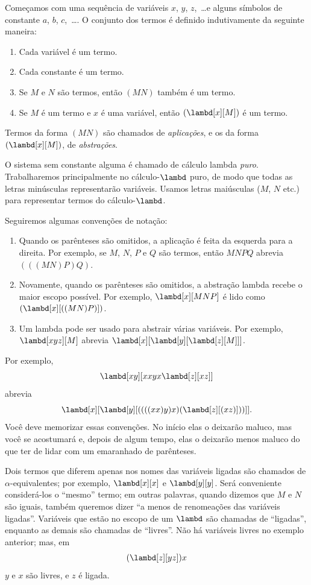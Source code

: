 \documentclass[../../../include/open-logic-section]{subfiles}
\begin{document}

Começamos com uma sequência de variáveis $x$, $y$, $z$,~\dots e alguns
símbolos de constante $a$, $b$, $c$,~\dots. O conjunto dos termos é definido
indutivamente da seguinte maneira:
\begin{enumerate}
\item Cada variável é um termo.
\item Cada constante é um termo.
\item Se $M$ e $N$ são termos, então $(MN)$ também é um termo.
\item Se $M$ é um termo e $x$ é uma variável, então $(\lambd[x][M])$ é um
  termo.
\end{enumerate}
Termos da forma $(MN)$ são chamados de \emph{aplicações}, e os da forma
$(\lambd[x][M])$, de \emph{abstrações}.

O sistema sem constante alguma é chamado de cálculo lambda \emph{puro}.
Trabalharemos principalmente no cálculo-$\lambd$ puro, de modo que todas as
letras minúsculas representarão variáveis. Usamos letras maiúsculas ($M$,
$N$ etc.) para representar termos do cálculo-$\lambd$.

Seguiremos algumas convenções de notação:

\begin{conv}
\begin{enumerate}
\item Quando os parênteses são omitidos, a aplicação é feita da esquerda
  para a direita. Por exemplo, se $M$, $N$, $P$ e $Q$ são termos, então
  $MNPQ$ abrevia $(((MN)P)Q)$.
\item Novamente, quando os parênteses são omitidos, a abstração lambda recebe
  o maior escopo possível. Por exemplo, $\lambd[x][MNP]$ é lido como
  $(\lambd[x][((MN)P)])$.
\item Um lambda pode ser usado para abstrair várias variáveis. Por exemplo,
  $\lambd[xyz][M]$ abrevia
  $\lambd[x][\lambd[y][\lambd[z][M]]]$.
\end{enumerate}
\end{conv}

Por exemplo,
\[
\lambd[xy][xxyx \lambd[z][xz]]
\]
abrevia
\[
\lambd[x][\lambd[y][((((xx)y)x)(\lambd[z][(xz)]))]].
\]
Você deve memorizar essas convenções. No início elas o deixarão maluco, mas
você se acostumará e, depois de algum tempo, elas o deixarão menos maluco do
que ter de lidar com um emaranhado de parênteses.

Dois termos que diferem apenas nos nomes das variáveis ligadas são chamados
de $\alpha$-equivalentes; por exemplo, $\lambd[x][x]$ e $\lambd[y][y]$.
Será conveniente considerá-los o ``mesmo'' termo; em outras palavras,
quando dizemos que $M$ e $N$ são iguais, também queremos dizer ``a menos de
renomeações das variáveis ligadas''. Variáveis que estão no escopo de um
$\lambd$ são chamadas de ``ligadas'', enquanto as demais são chamadas de
``livres''. Não há variáveis livres no exemplo anterior; mas, em
\[
(\lambd[z][yz])x
\]
$y$ e $x$ são livres, e $z$ é ligada.
\end{document}

